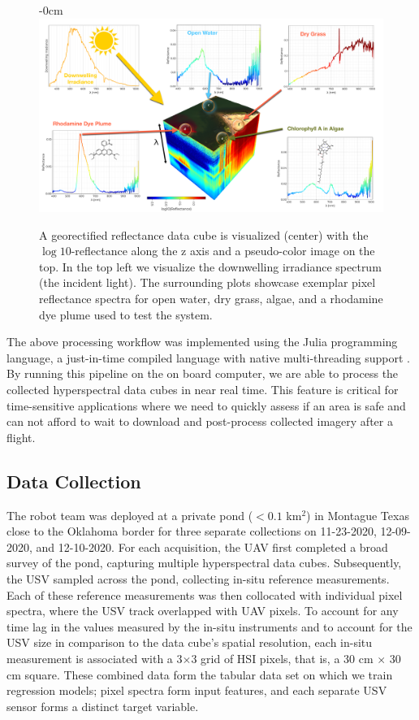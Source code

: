 \documentclass[remotesensing,article,submit,pdftex,moreauthors]{Definitions/mdpi}
\begin{document}
\begin{figure}[t!]
\begin{adjustwidth}{-\extralength}{0cm}
\centering
\vspace{-0.3in}
\includegraphics[width=15.5cm]{paper/figures/materials-and-methods/HyperSpectralInfoGraphic.pdf}
\end{adjustwidth}
\caption{A georectified reflectance data cube is visualized (center) with the $\log10$-reflectance along the z axis and a pseudo-color image on the top. In the top left we visualize the downwelling irradiance spectrum (the incident light). The surrounding plots showcase exemplar pixel reflectance spectra for open water, dry grass, algae, and a rhodamine dye plume used to test the system.\label{fig:hsi-infographic}}
\end{figure}  

The above processing workflow was implemented using the Julia programming language, a just-in-time compiled language with native multi-threading support \cite{julia-1}. By running this pipeline on the on board computer, we are able to process the collected hyperspectral data cubes in near real time. This feature is critical for time-sensitive applications where we need to quickly assess if an area is safe and can not afford to wait to download and post-process collected imagery after a flight.

\subsection{Data Collection}

The robot team was deployed at a private pond ($<0.1$ km$^{2}$) in Montague Texas close to the Oklahoma border for three separate collections on 11-23-2020, 12-09-2020, and 12-10-2020. For each acquisition, the UAV first completed a broad survey of the pond, capturing multiple hyperspectral data cubes. Subsequently, the USV sampled across the pond, collecting in-situ reference measurements. Each of these reference measurements was then collocated with individual pixel spectra, where the USV track overlapped with UAV pixels. To account for any time lag in the values measured by the in-situ instruments and to account for the USV size in comparison to the data cube's spatial resolution, each in-situ measurement is associated with a 3$\times$3 grid of HSI pixels, that is, a 30 cm $\times$ 30 cm square. These combined data form the tabular data set on which we train regression models; pixel spectra form input features, and each separate USV sensor forms a distinct target variable.
\end{document}
